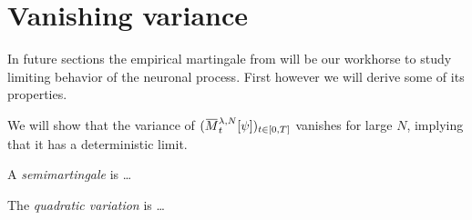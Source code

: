 \section{Vanishing variance}    %

In future sections the empirical martingale from  will be our workhorse to study limiting behavior of the neuronal process.
First however we will derive some of its properties.

We will show that the variance of \((\ol{M}_t^{\lambda,N}[\psi])_{t\in[0,T]}\) vanishes for large \(N\), implying that it has a deterministic limit.    %

\begin{definition}
  A \textit{semimartingale} is \dots
\end{definition}

\begin{definition}
  The \textit{quadratic variation} is \dots
\end{definition}



